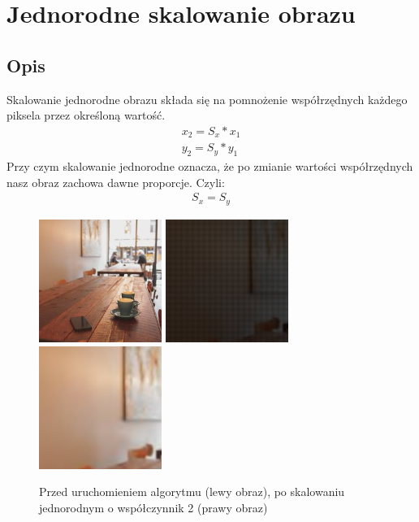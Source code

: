 \documentclass[a4paper,12pt]{book}
\begin{document}
\section{Jednorodne skalowanie obrazu}
\subsection*{Opis}
Skalowanie jednorodne obrazu składa się na pomnożenie współrzędnych każdego piksela przez określoną wartość. 
\begin{gather}
x_2 = S_x * x_1 \\
y_2 = S_y * y_1
\end{gather}
Przy czym skalowanie jednorodne oznacza, że po zmianie wartości współrzędnych nasz obraz zachowa dawne proporcje. Czyli: 
\begin{gather}
S_x = S_y
\end{gather}
\begin{figure}[H]
	\caption{Przed uruchomieniem algorytmu (lewy obraz), po skalowaniu jednorodnym o współczynnik 2 (prawy obraz)}
	\includegraphics[width=4cm, height=4cm]{coffee-unmodified.jpg}
	\includegraphics[width=4cm, height=4cm]{coffee-hscaling-without-interpolation.png}
	\includegraphics[width=4cm, height=4cm]{coffee-hscaling.png}
\end{figure}
\end{document}
